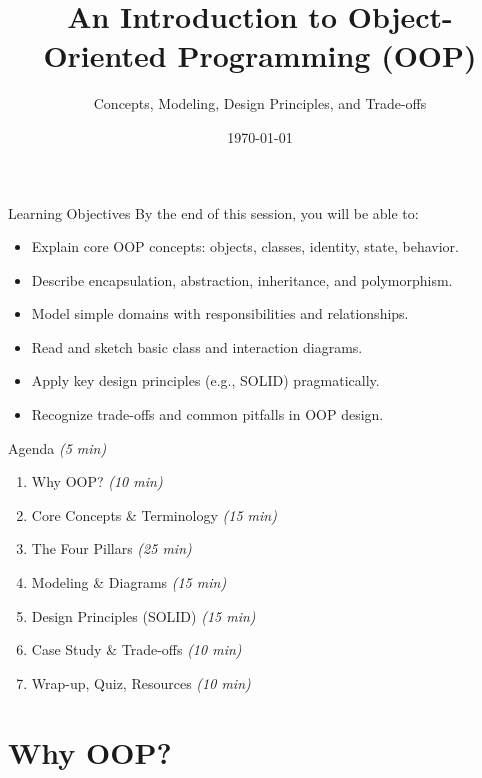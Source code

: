 \documentclass[aspectratio=169,11pt]{beamer}
\title{An Introduction to Object-Oriented Programming (OOP)}
\subtitle{Concepts, Modeling, Design Principles, and Trade-offs}
\date{\today}
\newcommand{\mins}[1]{\textit{(#1 min)}}
\begin{document}
\begin{frame}
  \titlepage
\end{frame}

\begin{frame}{Learning Objectives}
  By the end of this session, you will be able to:
  \begin{itemize}
    \item Explain core OOP concepts: objects, classes, identity, state, behavior.
    \item Describe encapsulation, abstraction, inheritance, and polymorphism.
    \item Model simple domains with responsibilities and relationships.
    \item Read and sketch basic class and interaction diagrams.
    \item Apply key design principles (e.g., SOLID) pragmatically.
    \item Recognize trade-offs and common pitfalls in OOP design.
  \end{itemize}
\end{frame}

\begin{frame}{Agenda \mins{5}}
  \begin{enumerate}
    \item Why OOP? \mins{10}
    \item Core Concepts \& Terminology \mins{15}
    \item The Four Pillars \mins{25}
    \item Modeling \& Diagrams \mins{15}
    \item Design Principles (SOLID) \mins{15}
    \item Case Study \& Trade-offs \mins{10}
    \item Wrap-up, Quiz, Resources \mins{10}
  \end{enumerate}
\end{frame}

\section{Why OOP?}
\end{document}

